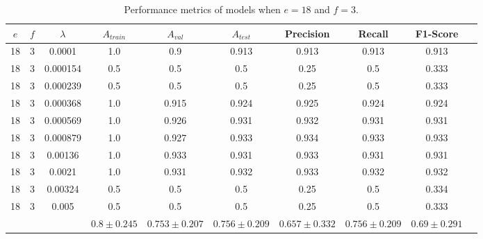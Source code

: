 \begin{table}[ht]
\centering
\begin{tabular}{ |c|c|c|c|c|c|c|c|c|c| }
\hline
$e$ & $f$ & $\lambda$ & $A_{train}$ & $A_{val}$ & $A_{test}$ & Precision & Recall & F1-Score \\
\hline
18 & 3 & 0.0001 & 1.0 & 0.9 & 0.913 & 0.913 & 0.913 & 0.913 \\
18 & 3 & 0.000154 & 0.5 & 0.5 & 0.5 & 0.25 & 0.5 & 0.333 \\
18 & 3 & 0.000239 & 0.5 & 0.5 & 0.5 & 0.25 & 0.5 & 0.333 \\
18 & 3 & 0.000368 & 1.0 & 0.915 & 0.924 & 0.925 & 0.924 & 0.924 \\
18 & 3 & 0.000569 & 1.0 & 0.926 & 0.931 & 0.932 & 0.931 & 0.931 \\
18 & 3 & 0.000879 & 1.0 & 0.927 & 0.933 & 0.934 & 0.933 & 0.933 \\
18 & 3 & 0.00136 & 1.0 & 0.933 & 0.931 & 0.933 & 0.931 & 0.931 \\
18 & 3 & 0.0021 & 1.0 & 0.931 & 0.932 & 0.933 & 0.932 & 0.932 \\
18 & 3 & 0.00324 & 0.5 & 0.5 & 0.5 & 0.25 & 0.5 & 0.334 \\
18 & 3 & 0.005 & 0.5 & 0.5 & 0.5 & 0.25 & 0.5 & 0.333 \\
\hline
 & & & $0.8\pm0.245$ & $0.753\pm0.207$ & $0.756\pm0.209$ & $0.657\pm0.332$ & $0.756\pm0.209$ & $0.69\pm0.291$ \\
\hline
\end{tabular}
\caption{Performance metrics of models when $e = 18$ and $f = 3$.}
\label{table:vgg16_finetuning_3}
\end{table}

